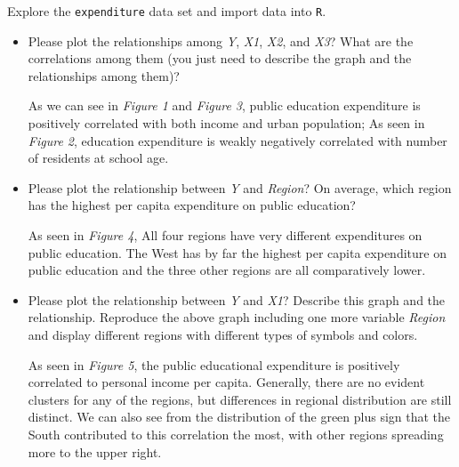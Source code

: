 \documentclass[12pt,letterpaper]{article}
\begin{document}
	\vspace{.5cm}
	\noindent Explore the \texttt{expenditure} data set and import data into \texttt{R}.
	\vspace{.5cm}
	  
	\vspace{.5cm}
	\begin{itemize}		
		\item
		Please plot the relationships among \emph{Y}, \emph{X1}, \emph{X2}, and \emph{X3}? What are the correlations among them (you just need to describe the graph and the relationships among them)?
		 
		As we can see in \emph{Figure 1} and \emph{Figure 3}, public education expenditure is positively correlated with both income and urban population; As seen in \emph{Figure 2}, education expenditure is weakly negatively correlated with number of residents at school age. 
		\vspace{.5cm}
		\item
		Please plot the relationship between \emph{Y} and \emph{Region}? On average, which region has the highest per capita expenditure on public education? 
		
		As seen in \emph{Figure 4}, All four regions have very different expenditures on public education. The West has by far the highest per capita expenditure on public education and the three other regions are all comparatively lower.
		
		\vspace{.5cm}
		\item
		Please plot the relationship between \emph{Y} and \emph{X1}? Describe this graph and the relationship. Reproduce the above graph including one more variable \emph{Region} and display different regions with different types of symbols and colors.

        As seen in \emph{Figure 5}, the public educational expenditure is positively correlated to personal income per capita. Generally, there are no evident clusters for any of the regions, but differences in regional distribution are still distinct. We can also see from the distribution of the green plus sign that the South contributed to this correlation the most, with other regions spreading more to the upper right.
		\vspace{.5cm}        
				
		
	\end{itemize}
    \clearpage  
\end{document}
